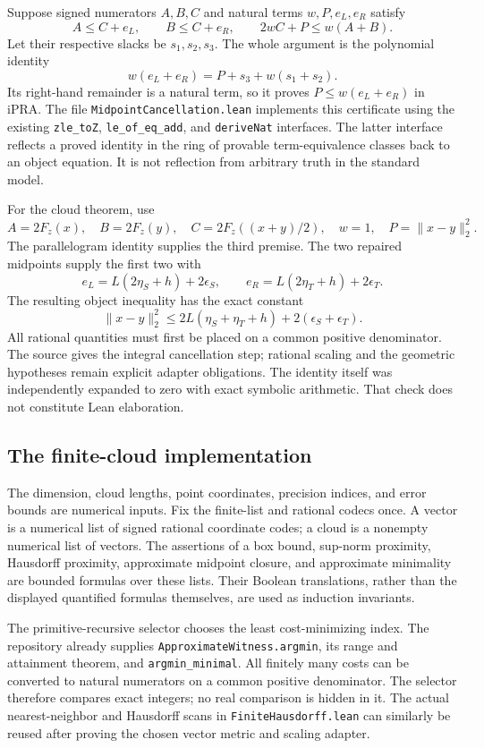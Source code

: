 Suppose signed numerators \(A,B,C\) and natural terms \(w,P,e_L,e_R\)
satisfy
\[
 A\leq C+e_L,\qquad B\leq C+e_R,\qquad
 2wC+P\leq w(A+B).
\]
Let their respective slacks be \(s_1,s_2,s_3\).  The whole argument is
the polynomial identity
\[
 w(e_L+e_R)=P+s_3+w(s_1+s_2).
\]
Its right-hand remainder is a natural term, so it proves
\(P\leq w(e_L+e_R)\) in iPRA.
The file \texttt{MidpointCancellation.lean} implements this certificate
using the existing \texttt{zle\_toZ}, \texttt{le\_of\_eq\_add}, and
\texttt{deriveNat} interfaces.  The latter interface reflects a proved
identity in the ring of provable term-equivalence classes back to an
object equation.  It is not reflection from arbitrary truth in the
standard model.

For the cloud theorem, use
\[
 A=2F_z(x),\quad B=2F_z(y),\quad
 C=2F_z((x+y)/2),\quad w=1,\quad P=\|x-y\|_2^2.
\]
The parallelogram identity supplies the third premise.  The two repaired
midpoints supply the first two with
\[
 e_L=L(2\eta_S+h)+2\epsilon_S,\qquad
 e_R=L(2\eta_T+h)+2\epsilon_T.
\]
The resulting object inequality has the exact constant
\[
 \|x-y\|_2^2\leq
 2L(\eta_S+\eta_T+h)+2(\epsilon_S+\epsilon_T).
\]
All rational quantities must first be placed on a common positive
denominator.  The source gives the integral cancellation step; rational
scaling and the geometric hypotheses remain explicit adapter obligations.
The identity itself was independently expanded to zero with exact
symbolic arithmetic.  That check does not constitute Lean elaboration.

\subsection{The finite-cloud implementation}

The dimension, cloud lengths, point coordinates, precision indices, and
error bounds are numerical inputs.  Fix the finite-list and rational
codecs once.  A vector is a numerical list of signed rational coordinate
codes; a cloud is a nonempty numerical list of vectors.  The assertions
of a box bound, sup-norm proximity, Hausdorff proximity, approximate
midpoint closure, and approximate minimality are bounded formulas over
these lists.  Their Boolean translations, rather than the displayed
quantified formulas themselves, are used as induction invariants.

The primitive-recursive selector chooses the least cost-minimizing
index.  The repository already supplies
\texttt{ApproximateWitness.argmin}, its range and attainment theorem,
and \texttt{argmin\_minimal}.  All finitely many costs can be converted
to natural numerators on a common positive denominator.  The selector
therefore compares exact integers; no real comparison is hidden in it.
The actual nearest-neighbor and Hausdorff scans in
\texttt{FiniteHausdorff.lean} can similarly be reused after proving the
chosen vector metric and scaling adapter.

